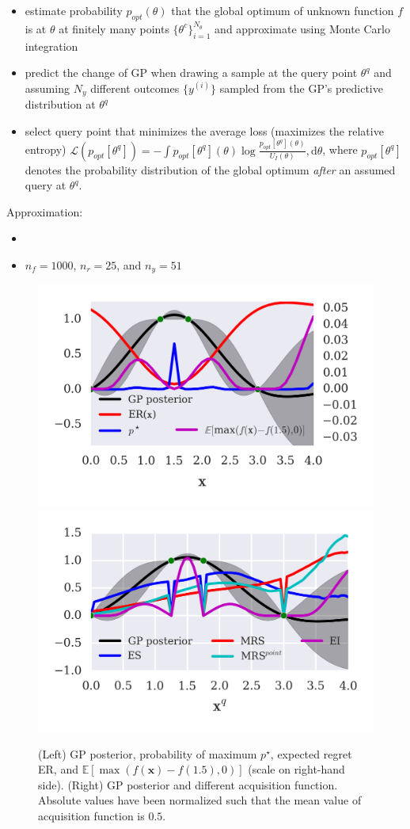 \begin{block}{}

\begin{itemize}
 \item estimate probability $p_{opt}(\theta)$ that the global optimum of unknown function $f$ is at $\theta$ at finitely many points $\{\theta^c\}_{i=1}^{N_\theta}$ and approximate using Monte Carlo integration
 \item predict the change of GP when drawing a sample at the query point
$\theta^q$ and assuming $N_y$ different outcomes $\{y^{(i)}\}$ sampled from the
GP's predictive distribution at $\theta^q$
 \item select query point that minimizes the average loss (maximizes the relative entropy) $\mathcal{L}(p_{opt}[\theta^q]) = - \int p_{opt}[\theta^q](\theta) \log \frac{p_{opt}[\theta^q](\theta)}{U_I(\theta)}, \text{d}\theta$,  where $p_{opt}[\theta^q]$ denotes the probability
 distribution of the global optimum \emph{after} an assumed query at $\theta^q$.
\end{itemize}

Approximation:
\begin{itemize}
 \item 
 \item $n_f=1000$, $n_r=25$, and $n_y=51$
\end{itemize}
\end{block}

\begin{block}{}
\vspace*{1cm}

\begin{figure}
\centering
\includegraphics[width=0.48\columnwidth]{../pics/regret_illustration}
\includegraphics[width=0.48\columnwidth]{../pics/acq_comparison}
\caption{(Left) GP posterior, probability of maximum $p^\star$, expected regret ER, and  $\mathbb{E}[\max(f(\mathbf{x}) - f(1.5), 0)]$ (scale on right-hand side). (Right) GP posterior and different acquisition function. Absolute values have been normalized such that the mean value of acquisition function is $0.5$.}
\label{fig:MRS_illustration}
\end{figure}
\end{block}
